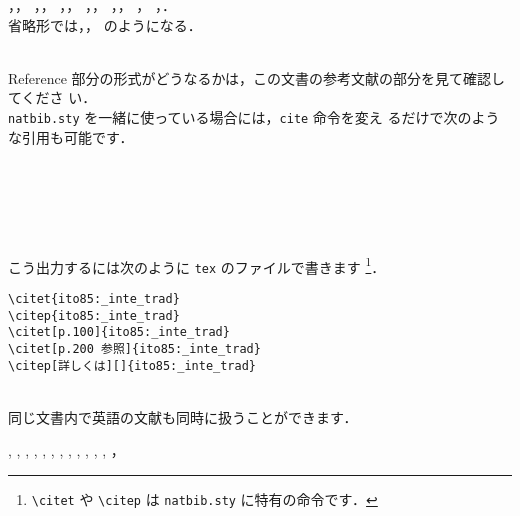\documentclass[a4j,10pt]{jarticle}
\begin{document}
\begin{screen}
\citet{miyazawa02:_io_intr}，\citet{isikawa02jp:_env_trade}，
\citet{oyama99:_mark_stru}，\citet{kuroda97jp:keo}，
\citet{kiyono93:_regu_comp_1}，\citet{iwamoto91jp:haito-keika}，
\citet{ito85:_inte_trad}，\citet{nishimura90:_micr_econ}，
\citet*{imai72:_micr_2}，\citet*{imai71:_micr_1}，
\citet{somusho04jp:2000io-kaisetsu}，
\citet{barro97jp}，\citet*{markusen99jp:trade_vol_1}．\\
省略形では，\citet{imai71:_micr_1}，\citet{markusen99jp:trade_vol_1}
のようになる．
\end{screen}
\\

Reference 部分の形式がどうなるかは，この文書の参考文献の部分を見て確認してくださ
い．
\\

\texttt{natbib.sty} を一緒に使っている場合には，\texttt{cite} 命令を変え
るだけで次のような引用も可能です．

\begin{screen}
\hspace*{1cm} \citet{ito85:_inte_trad}\\
\hspace*{1cm} \citep{ito85:_inte_trad}\\
\hspace*{1cm} \citet[p.100]{ito85:_inte_trad}\\
\hspace*{1cm} \citet[p.200 参照]{ito85:_inte_trad}\\
\hspace*{1cm} \citep[詳しくは][]{ito85:_inte_trad}
\end{screen}

こう出力するには次のように \texttt{tex} のファイルで書きます
\footnote{\verb|\citet| や \verb|\citep| は \texttt{natbib.sty} に特有の命令です．}．

\begin{screen}
 \begin{verbatim}
\citet{ito85:_inte_trad}
\citep{ito85:_inte_trad}
\citet[p.100]{ito85:_inte_trad}
\citet[p.200 参照]{ito85:_inte_trad}
\citep[詳しくは][]{ito85:_inte_trad}
 \end{verbatim}
\end{screen}
\\

同じ文書内で英語の文献も同時に扱うことができます．

\begin{screen}
 \citet{ishikawa03:_green_gas_emiss_contr_open_econom},
 \citet{ishikawa94:_revis_stolp_samuel_rybcz_theor_produc_exter},
 \citet{brooke03:_gams},
 \citet{rutherford00:_gtapin_gtap_eg},
 \citet{fujita99jp:_spatial_econom},
 \citet{wong95:_inter_trade_goods_factor_mobil_},
 \citet{brezis93:_leapf_inter_compet},
 \citet{krugman91:_geogr_trade},
 \citet{krugman91:_is_bilat_bad},
 \citet{wang89:_model_therm_hydrod_aspec_molten},
 \citet{lucas76:_econom_polic_evaluat},
 \citet{milne-thomson68:_theor_hydrod},
 \citet{2007yamasue482353}，
 \citet{2009yamasue502165} 
\end{screen}
\end{document}
